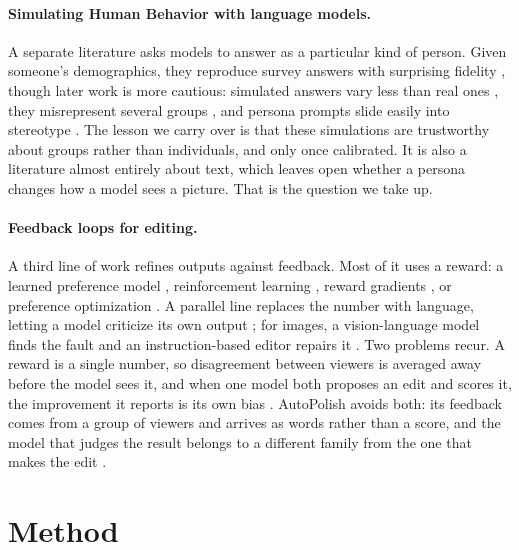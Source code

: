 \documentclass{article}
\begin{document}
\paragraph{Simulating Human Behavior with language models.} A separate literature asks models to answer as a particular kind of person. Given someone's demographics, they reproduce survey answers with surprising fidelity \citep{argyle2023}, though later work is more cautious: simulated answers vary less than real ones \citep{bisbee2024synthetic}, they misrepresent several groups \citep{santurkar2023whose}, and persona prompts slide easily into stereotype \citep{cheng2023compost}. The lesson we carry over is that these simulations are trustworthy about groups rather than individuals, and only once calibrated. It is also a literature almost entirely about text, which leaves open whether a persona changes how a model sees a picture. That is the question we take up.

\paragraph{Feedback loops for editing.} A third line of work refines outputs against feedback. Most of it uses a reward: a learned preference model \citep{xu2023imagereward, kirstain2023pickapic}, reinforcement learning \citep{fan2023dpok, black2024ddpo}, reward gradients \citep{clark2024draft, prabhudesai2023alignprop}, or preference optimization \citep{wallace2024dpo}. A parallel line replaces the number with language, letting a model criticize its own output \citep{madaan2023selfrefine, shinn2023reflexion, gou2024critic}; for images, a vision-language model finds the fault and an instruction-based editor repairs it \citep{wu2024sld, wang2024genartist, brooks2023instructpix2pix, flux2024}. Two problems recur. A reward is a single number, so disagreement between viewers is averaged away before the model sees it, and when one model both proposes an edit and scores it, the improvement it reports is its own bias \citep{xu2024selfbias}. AutoPolish avoids both: its feedback comes from a group of viewers and arrives as words rather than a score, and the model that judges the result belongs to a different family from the one that makes the edit \citep{schuhmann2022, oquab2023}.

\section{Method}
\end{document}

